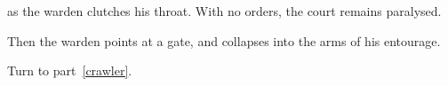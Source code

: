 as the \gls{warden} clutches his throat.
With no orders, the \gls{court} remains paralysed.

Then the \gls{warden} points at a gate, and collapses into the arms of his entourage.

Turn to part~\vref{crawler}.

